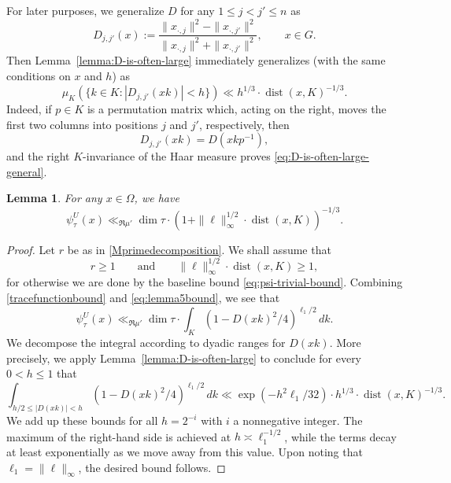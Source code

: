 \documentclass[11pt,oneside]{amsart}
\numberwithin{equation}{section}
\theoremstyle{remark}
\theoremstyle{plain}
\newtheorem{lemma}{Lemma}
\DeclareMathOperator{\dist}{dist}
\renewcommand\leq{\leqslant}
\renewcommand\geq{\geqslant}
\begin{document}
For later purposes, we generalize $D$ for any $1\leq j<j' \leq n$ as
\begin{equation}\label{eq:D-def-general}
D_{j,j'}(x):=\frac{\|x_{\cdot,j}\|^2 - \|x_{\cdot,j'}\|^2}{\|x_{\cdot,j}\|^2 + \|x_{\cdot,j'}\|^2}, \qquad x\in G.
\end{equation} 
Then Lemma~\ref{lemma:D-is-often-large} immediately generalizes (with the same conditions on $x$ and $h$) as
\begin{equation}\label{eq:D-is-often-large-general}
\mu_K\left(\{k\in K: |D_{j,j'}(xk)| < h\}\right) \ll h^{1/3} \cdot \dist(x,K)^{-1/3}.
\end{equation}
Indeed, if $p\in K$ is a permutation matrix which, acting on the right, moves the first two columns into positions $j$ and $j'$, respectively, then
\[
D_{j,j'}(xk)=D(xkp^{-1}),
\]
and the right $K$-invariance of the Haar measure proves \eqref{eq:D-is-often-large-general}.

\begin{lemma}\label{lemma:thm3-big-ell} For any $x\in\Omega$, we have
\begin{equation}\label{eq:thm3-big-ell}
\psi_{\tau}^{U}(x) \ll_{\Re\mu'} \dim \tau \cdot \left(1+\|\bm\ell\|_{\infty}^{1/2}\cdot\dist(x,K)\right)^{-1/3}.
\end{equation}
\end{lemma}
\begin{proof} Let $r$ be as in \eqref{Mprimedecomposition}. We shall assume that 
\[r\geq 1\qquad\text{and}\qquad\|\bm\ell\|_{\infty}^{1/2}\cdot\dist(x,K)\geq 1,\]
for otherwise we are done by the baseline bound \eqref{eq:psi-trivial-bound}. Combining \eqref{tracefunctionbound} and \eqref{eq:lemma5bound}, we see that
\[\psi_\tau^{U}(x)\ll_{\Re\mu'} \dim\tau \cdot \int_K \left(1-D(xk)^2/4\right)^{\ell_1/2}\,dk.\]
We decompose the integral according to dyadic ranges	for $D(xk)$. More precisely, we apply Lemma~\ref{lemma:D-is-often-large} to conclude for every $0<h\leq 1$ that
\[\int_{h/2\leq |D(xk)|<h}\left(1-D(xk)^2/4\right)^{\ell_1/2}\,dk\ll
\exp(-h^2\ell_1/32)\cdot h^{1/3} \cdot \dist(x,K)^{-1/3}.\]
We add up these bounds for all $h=2^{-i}$ with $i$ a nonnegative integer. The maximum of the right-hand side is achieved at $h\asymp\ell_1^{-1/2}$, while the terms decay at least exponentially as we move away from this value. Upon noting that $\ell_1 = \|\bm\ell\|_{\infty}$, the desired bound follows.
\end{proof}
\end{document}
